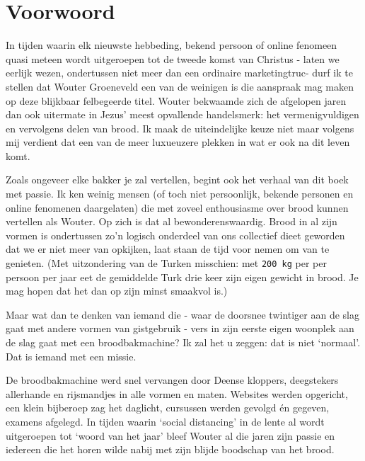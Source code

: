 \documentclass[
  11pt,
  dutch,
]{memoir}
\begin{document}
\endgroup
\clearpage


\pagestyle{empty}

\renewcommand*\contentsname{Inhoudsopgave}
{
  \setcounter{tocdepth}{2}
  \tableofcontents*
}

\clearpage
\pagestyle{desem}


\mainmatter
\frontmatter
\pagestyle{desem}

\hypertarget{voorwoord}{%
\chapter{Voorwoord}\label{voorwoord}}

In tijden waarin elk nieuwste hebbeding, bekend persoon of online
fenomeen quasi meteen wordt uitgeroepen tot de tweede komst van Christus
- laten we eerlijk wezen, ondertussen niet meer dan een ordinaire
marketingtruc- durf ik te stellen dat Wouter Groeneveld een van de
weinigen is die aanspraak mag maken op deze blijkbaar felbegeerde titel.
Wouter bekwaamde zich de afgelopen jaren dan ook uitermate in Jezus'
meest opvallende handelsmerk: het vermenigvuldigen en vervolgens delen
van brood. Ik maak de uiteindelijke keuze niet maar volgens mij verdient
dat een van de meer luxueuzere plekken in wat er ook na dit leven komt.

Zoals ongeveer elke bakker je zal vertellen, begint ook het verhaal van
dit boek met passie. Ik ken weinig mensen (of toch niet persoonlijk,
bekende personen en online fenomenen daargelaten) die met zoveel
enthousiasme over brood kunnen vertellen als Wouter. Op zich is dat al
bewonderenswaardig. Brood in al zijn vormen is ondertussen zo'n logisch
onderdeel van ons collectief dieet geworden dat we er niet meer van
opkijken, laat staan de tijd voor nemen om van te genieten. (Met
uitzondering van de Turken misschien: met \texttt{200\ kg} per per
persoon per jaar eet de gemiddelde Turk drie keer zijn eigen gewicht in
brood. Je mag hopen dat het dan op zijn minst smaakvol is.)

Maar wat dan te denken van iemand die - waar de doorsnee twintiger aan
de slag gaat met andere vormen van gistgebruik - vers in zijn eerste
eigen woonplek aan de slag gaat met een broodbakmachine? Ik zal het u
zeggen: dat is niet `normaal'. Dat is iemand met een missie.

De broodbakmachine werd snel vervangen door Deense kloppers, deegstekers
allerhande en rijsmandjes in alle vormen en maten. Websites werden
opgericht, een klein bijberoep zag het daglicht, cursussen werden
gevolgd én gegeven, examens afgelegd. In tijden waarin `social
distancing' in de lente al wordt uitgeroepen tot `woord van het jaar'
bleef Wouter al die jaren zijn passie en iedereen die het horen wilde
nabij met zijn blijde boodschap van het brood.
\end{document}
